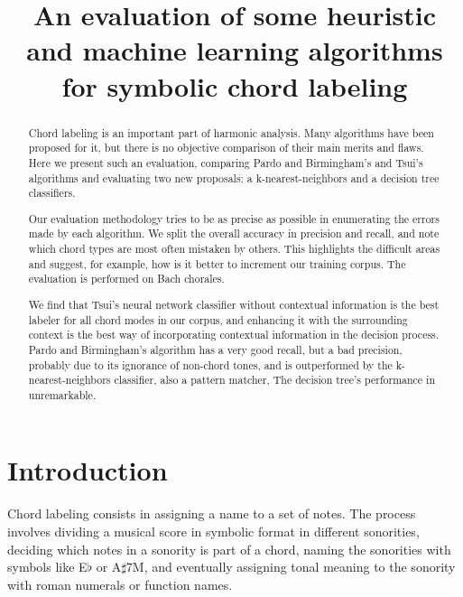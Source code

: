 \documentclass{article}
\title{An evaluation of some heuristic and machine learning algorithms for
  symbolic chord labeling}
\begin{document}
\graphicspath{{figs/}{data/}}
\maketitle

\begin{abstract}

  Chord labeling is an important part of harmonic analysis. Many
  algorithms have been proposed for it, but there is no objective
  comparison of their main merits and flaws. Here we present such an
  evaluation, comparing Pardo and Birmingham's and Tsui's algorithms
  and evaluating two new proposals: a k-nearest-neighbors and a
  decision tree classifiers.
  
  Our evaluation methodology tries to be as precise as possible in
  enumerating the errors made by each algorithm. We split the overall
  accuracy in precision and recall, and note which chord types are
  most often mistaken by others. This highlights the difficult areas
  and suggest, for example, how is it better to increment our training
  corpus. The evaluation is performed on Bach chorales.
  
  We find that Tsui's neural network classifier without contextual
  information is the best labeler for all chord modes in our corpus,
  and enhancing it with the surrounding context is the best way of
  incorporating contextual information in the decision process. Pardo
  and Birmingham's algorithm has a very good recall, but a bad
  precision, probably due to its ignorance of non-chord tones, and is
  outperformed by the k-nearest-neighbors classifier, also a pattern
  matcher, The decision tree's performance in unremarkable.
\end{abstract}

\section{Introduction}
\label{sec:introduction}

Chord labeling consists in assigning a name to a set of notes. The
process involves dividing a musical score in symbolic format in
different sonorities, deciding which notes in a sonority is part of a
chord, naming the sonorities with symbols like E$\flat$ or
A$\sharp$7M, and eventually assigning tonal meaning to the sonority
with roman numerals or function names.
\end{document}
